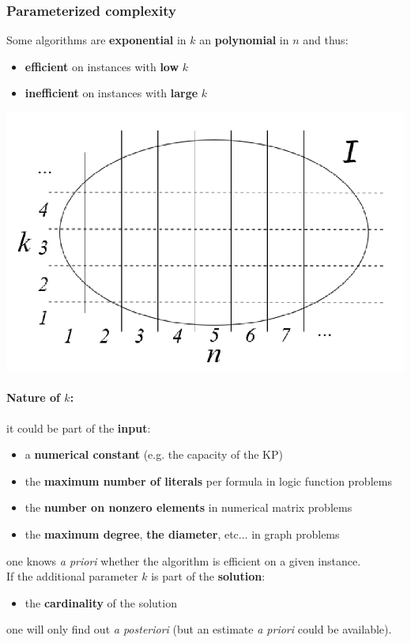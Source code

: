 \subsubsection{Parameterized complexity}
Some algorithms are \textbf{exponential} in $k$ an \textbf{polynomial} in $n$ and thus: 
\begin{itemize}
	\item \textbf{efficient} on instances with \textbf{low} $k$
	\item \textbf{inefficient} on instances with \textbf{large} $k$
\end{itemize}
\begin{center}
	\includegraphics[width=0.5\columnwidth]{img/PC1}
\end{center}

\newpage

\paragraph{Nature of $k$:} it could be part of the \textbf{input}: 
\begin{itemize}
	\item a \textbf{numerical constant} (e.g. the capacity of the KP)
	\item the \textbf{maximum number of literals} per formula in logic function problems
	\item the \textbf{number on nonzero elements} in numerical matrix problems
	\item the \textbf{maximum degree}, \textbf{the diameter}, etc... in graph problems
\end{itemize}
one knows \textit{a priori} whether the algorithm is efficient on a given instance.\\

If the additional parameter $k$ is part of the \textbf{solution}: 
\begin{itemize}
	\item the \textbf{cardinality} of the solution
\end{itemize}
one will only find out \textit{a posteriori} (but an estimate \textit{a priori} could be available).\\

